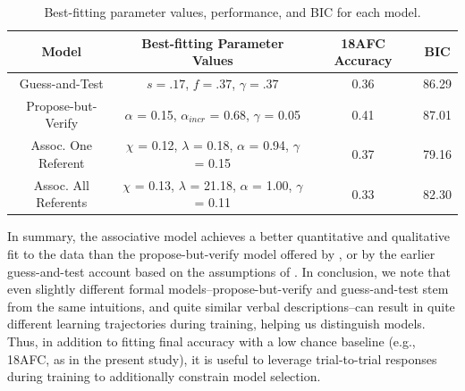 \documentclass[man,floatsintext]{apa6}
\begin{document}
\begin{table}[ht] 
\begin{center}
\caption{Best-fitting parameter values, performance, and BIC for each model.} 
\label{tab:model_fits} 
\vskip 0.05in
\begin{tabular}{c | c | c | c }
 \hline
Model & Best-fitting Parameter Values & 18AFC Accuracy & BIC  \\
\hline 
Guess-and-Test      & $s = .17$, $f = .37$, $\gamma = .37$ 				  		    & 0.36  &  86.29  \\
Propose-but-Verify  & $\alpha$ = 0.15, $\alpha_{incr}$ = 0.68, $\gamma$ = 0.05 		    & 0.41  &  87.01  \\
Assoc. One Referent & $\chi$ = 0.12, $\lambda$ = 0.18, $\alpha$ = 0.94,  $\gamma$ = 0.15 & 0.37 & 79.16   \\
Assoc. All Referents  & $\chi$ = 0.13, $\lambda$ = 21.18, $\alpha$ = 1.00, $\gamma$ = 0.11 & 0.33 & 82.30  \\
\hline
\end{tabular} 
\end{center}
\end{table}


In summary, the associative model achieves a better quantitative and qualitative fit to the data than the propose-but-verify model offered by \citep{Trueswell:2013}, or by the earlier guess-and-test account based on the assumptions of \citep{Medina:2011}. In conclusion, we note that even slightly different formal models--propose-but-verify and guess-and-test stem from the same intuitions, and quite similar verbal descriptions--can result in quite different learning trajectories during training, helping us distinguish models. Thus, in addition to fitting final accuracy with a low chance baseline (e.g., 18AFC, as in the present study), it is useful to leverage trial-to-trial responses during training to additionally constrain model selection. 
\end{document}
